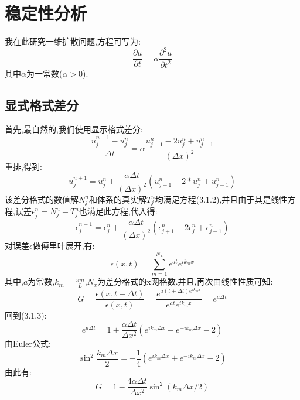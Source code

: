 \documentclass{article}
\numberwithin{equation}{subsection}
\begin{document}
\section{稳定性分析}
我在此研究一维扩散问题,方程可写为\cite{scherer_computational_2013}:
\begin{equation}
    \frac{\partial u}{\partial t} = \alpha \frac{\partial^2 u}{\partial t^2}
\end{equation}
其中$\alpha$为一常数($\alpha>0$).
\subsection{显式格式差分}
首先,最自然的,我们使用显示格式差分:
\begin{equation}
    \frac{u^{n+1}_j - u^n_j}{\Delta t} = \alpha\frac{u^n_{j+1}-2u^n_j + u^n_{j-1}}{(\Delta x)^2}
\end{equation}
重排,得到:
\begin{equation}
    u^{n+1}_j = u^n_j + \frac{\alpha \Delta t}{(\Delta x)^2}(u^n_{j+1}-2*u^n_j+u^n_{j-1})
\end{equation}
该差分格式的数值解$N^n_j$和体系的真实解$T^n_j$均满足方程(3.1.2),并且由于其是线性方程,误差$\epsilon^n_j = N^n_j - T^n_j$也满足此方程,代入得:
\begin{equation}
    \epsilon^{n+1}_j = \epsilon^n_j + \frac{\alpha \Delta t}{(\Delta x)^2}(\epsilon^n_{j+1}-2\epsilon^n_j+\epsilon^n_{j-1})
\end{equation}
对误差$\epsilon$做傅里叶展开,有:
\begin{equation}
    \epsilon(x,t) = \sum_{m=1}^{N_x}e^{at}e^{ik_m x}
\end{equation}
其中,$a$为常数,$k_m = \frac{\pi m}{L}$,$N_x$为差分格式的x网格数.并且,再次由线性性质可知:
\begin{equation}
    G = \frac{\epsilon(x,t+\Delta t)}{\epsilon(x,t)} = \frac{e^{a(t+\Delta t)e^{ik_m x}}}{e^{at}e^{ik_m x}} = e^{a\Delta t}
\end{equation}
回到(3.1.3):
\begin{equation}
    e^{a \Delta t}=1+\frac{\alpha \Delta t}{\Delta x^{2}}\left(e^{i k_{m} \Delta x}+e^{-i k_{m} \Delta x}-2\right)
\end{equation}
由Euler公式:
\begin{equation}
    \sin ^{2} \frac{k_{m} \Delta x}{2} = -\frac{1}{4}\left(e^{i k_{m} \Delta x}+e^{-i k_{m} \Delta x}-2\right)
\end{equation}
由此有:
\begin{equation}
    G = 1-\frac{4 \alpha \Delta t}{\Delta x^{2}} \sin ^{2}\left(k_{m} \Delta x / 2\right)
\end{equation}
\end{document}
